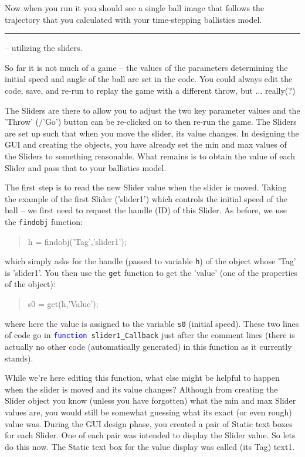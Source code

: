 \documentclass{tufte-book} %
\newenvironment{docspec}{\begin{quotation}\ttfamily\parskip0pt\parindent0pt\ignorespaces}{\end{quotation}}
\begin{document}
Now when you run it you should see a single ball image that follows the  trajectory that you calculated with your time-stepping ballistics model.

\vspace{1mm}
\noindent\rule{4cm}{0.5pt}
\vspace{-2mm}

 -- utilizing the sliders.

\noindent So far it is not much of a game -- the values of the parameters determining the initial speed and angle of the ball are set in the code. You could always edit the code, save, and re-run to replay the game with a different throw, but ... really(?)

The \textsf{Sliders} are there to allow you to adjust the two key parameter values and the 'Throw' (/'Go') button can be re-clicked on to then re-run the game. The \textsf{Sliders} are set up such that when you move the slider, its value changes. In designing the GUI and creating the objects, you have already set the min and max values of the \textsf{Sliders} to something reasonable. What remains is to obtain the value of each \textsf{Slider} and pass that to your ballistics model.

The first step is to read the new \textsf{Slider} value when the slider is moved. Taking the example of the first \textsf{Slider} ('\textsf{slider1}') which controls the initial speed of the ball -- we first need to request the handle (ID) of this \textsf{Slider}. As before, we use the \texttt{findobj} function:
\begin{docspec}
h = findobj(\textcolor[rgb]{0.501961,0,1}{'Tag'},\textcolor[rgb]{0.501961,0,1}{'slider1'});
\end{docspec}
which simply asks for the handle (passed to variable \texttt{h}) of the object whose '\textsf{Tag}' is '\textsf{slider1}'. You then use the \texttt{get} function to get the '\textsf{value}' (one of the properties of the object):
\begin{docspec}
s0 = get(h,\textcolor[rgb]{0.501961,0,1}{'Value'});
\end{docspec}
where here the value is assigned to the variable \texttt{s0} (initial speed). These two lines of code go in \texttt{\textcolor{blue}{function} slider1\_Callback} just after the comment lines (there is actually no other code (automatically generated) in this function as it currently stands). 

While we're here editing this function, what else might be helpful to happen when the slider is moved and its value changes? Although from creating the \textsf{Slider} object you know (unless you have forgotten) what the min and max \textsf{Slider} values are, you would still be somewhat guessing what its exact (or even rough) value was. During the GUI design phase, you created a pair of \textsf{Static text} boxes for each \textsf{Slider}. One of each pair was intended to display the \textsf{Slider} value. So lets do this now. The \textsf{Static text} box for the value display was called (its \textsf{Tag}) \textsf{text1}.
\end{document}
